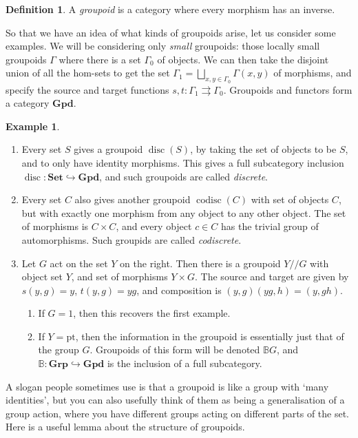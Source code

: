 \documentclass{tufte-handout}
\def\into {\hookrightarrow}
\def\pt {\mathrm{pt}}
\def\Set {\mathbf{Set}}
\def\Grp {\mathbf{Grp}}
\def\Gpd {\mathbf{Gpd}}
\def\BB{\mathbb{B}}
\DeclareMathOperator{\disc}{disc}
\DeclareMathOperator{\codisc}{codisc}
\theoremstyle{definition}
\newtheorem{definition}{Definition}
\newtheorem{example}{Example}
\begin{document}
\begin{definition}
A \emph{groupoid} is a category where every morphism has an inverse.
\end{definition}

So that we have an idea of what kinds of groupoids arise, let us consider some examples. 
We will be considering only \emph{small} groupoids: those locally small groupoids 
$\Gamma$ where there is a set $\Gamma_0$ of objects. We can then take the disjoint union 
of all the hom-sets to get the set $\Gamma_1= \bigsqcup_{x,y\in \Gamma_0} \Gamma(x,y)$ of morphisms, and specify the source and 
target functions $s,t\colon \Gamma_1\rightrightarrows \Gamma_0$. Groupoids and functors 
form a category $\Gpd$.

\begin{example}
\begin{enumerate}
\item Every set $S$ gives a groupoid $\disc(S)$, by taking the set of objects to be $S$, and to only have identity
morphisms. This gives a full subcategory inclusion $\disc\colon \Set \into \Gpd$, and such groupoids are called \emph{discrete}.
\item Every set $C$ also gives another groupoid $\codisc(C)$ with set of objects $C$, but with exactly 
one morphism from any object to any other object. The set of morphisms is $C\times C$, and every 
object $c\in C$ has the trivial group of automorphisms. Such groupids are called \emph{codiscrete}.
\item Let $G$ act on the set $Y$ on the right. Then there is a groupoid $Y/\!/G$ with object set $Y$, and set of 
morphisms $Y\times G$. The source and target are given by $s(y,g)=y$, $t(y,g)=yg$, and composition is $(y,g)(yg,h) = (y,gh)$.
\begin{enumerate}
\item If $G=1$, then this recovers the first example.
\item If $Y=\pt$, then the information in the groupoid is essentially just that of the group $G$. Groupoids of this form will be denoted $\BB G$, and $\BB\colon \Grp \into \Gpd$ is the inclusion of a full subcategory.
\end{enumerate}
\end{enumerate}
\end{example}

A slogan people sometimes use is that a groupoid is like a group with `many identities', 
but you can also usefully think of them as being a generalisation of a group action, 
where you have different groups acting on different parts of the set. Here is a useful 
lemma about the structure of groupoids.
\end{document}
